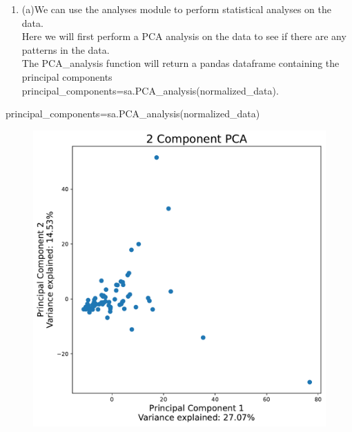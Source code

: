 \documentclass[
  letterpaper,
  DIV=11,
  numbers=noendperiod]{scrartcl}
\newenvironment{Shaded}{\begin{snugshade}}{\end{snugshade}}
\newcommand{\NormalTok}[1]{\textcolor[rgb]{0.00,0.23,0.31}{#1}}
\newcommand{\OperatorTok}[1]{\textcolor[rgb]{0.37,0.37,0.37}{#1}}
\providecommand{\tightlist}{%
  \setlength{\itemsep}{0pt}\setlength{\parskip}{0pt}}\usepackage{longtable,booktabs,array}
\begin{document}
\begin{enumerate}
\def\labelenumi{\arabic{enumi}.}
\setcounter{enumi}{2}
\tightlist
\item
  (a)We can use the analyses module to perform statistical analyses on
  the data.\\
  Here we will first perform a PCA analysis on the data to see if there
  are any patterns in the data.\\
  The PCA\_analysis function will return a pandas dataframe containing
  the principal components
  principal\_components=sa.PCA\_analysis(normalized\_data).
\end{enumerate}

\begin{Shaded}
\begin{Highlighting}[]
\NormalTok{principal\_components}\OperatorTok{=}\NormalTok{sa.PCA\_analysis(normalized\_data)}
\end{Highlighting}
\end{Shaded}

\begin{figure}[H]

{\centering \includegraphics{tutorial_files/figure-pdf/perform_pca-output-1.pdf}

}

\end{figure}
\end{document}

